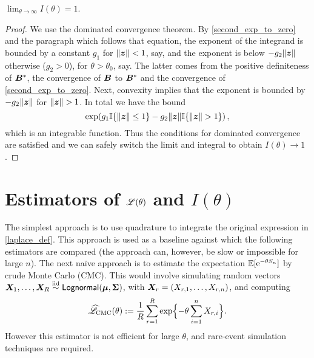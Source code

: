 \begin{proposition} $\lim_{\theta \to \infty} I(\theta) = 1$.
\end{proposition}

\begin{proof}
We use the dominated convergence theorem. By \eqref{second_exp_to_zero} and
the paragraph which follows that equation, the exponent of the integrand is
bounded by a constant $g_1$ for $\lVert \bm{z}\rVert < 1$, say, and the exponent is
below $-g_2 \lVert \bm{z}\rVert$ otherwise ($g_2 > 0$), for $\theta > \theta_0$, say. The
latter comes from the positive definiteness of $\bm{B}^*$, the convergence of
$\bm{B}$ to $\bm{B}^*$ and the convergence of \eqref{second_exp_to_zero}. Next,
convexity implies that the exponent is bounded by $-g_2\lVert \bm{z}\rVert$ for $\lVert \bm{z}\rVert
> 1$. In total we have the bound
%
\[ \exp( g_1 \mathbb{I}\{ \lVert \bm{z}\rVert \leq 1 \} - g_2 \lVert \bm{z}\rVert \mathbb{I}\{ \lVert \bm{z}\rVert > 1 \} ) \,, \]
%
which is an integrable function. Thus the conditions for dominated convergence
are satisfied and we can safely switch the limit and integral to obtain
$I(\theta) \to 1$.
\end{proof}

\section{Estimators of $\mathscr{L}(\theta)$ and $I(\theta)$}\label{S:Laplace}

The simplest approach is to use quadrature to integrate the original expression in
\eqref{laplace_def}. This approach is used as a baseline against which the
following estimators are compared (the approach can, however,  be slow or
impossible for large $n$). The next na{\"i}ve approach is to estimate the
expectation $\operatorname{{\mathbb E}}[\mathrm{e}^{-\theta S_n}]$ by crude Monte Carlo (CMC). This would
involve simulating random vectors $\bm{X}_1, \dots, \bm{X}_R \overset{\smash{\mathrm{iid}}}{\sim} \mathsf{Lognormal}(\bm{\mu},
\bm{\Sigma})$, with $\bm{X}_r = (X_{r,1}, \dots, X_{r,n})$, and computing
%
\[ \widehat{\mathscr{L}}_{\mathrm{CMC}}(\theta) := \frac{1}{R} \sum_{r=1}^R
  \exp\Bigl\{-\theta \sum_{i=1}^n X_{r,i}\Bigr\}. \]
%
However this estimator is not efficient for large $\theta$, and rare-event
simulation techniques are required.


